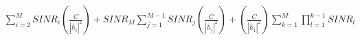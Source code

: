 \documentclass[preview]{standalone}
\begin{document}
\begin{align*}
\sum_{i=2}^{M} SINR_i \left( \frac{C}{\left|{\hat{h}_i}\right|^2} \right) + SINR_M \sum_{j=1}^{M-1} SINR_j \left( \frac{C}{\left|{\hat{h}_j}\right|^2} \right) + \left( \frac{C}{\left|{\hat{h}_1}\right|^2} \right) \sum_{k=1}^{M} \prod_{l=1}^{k-1} SINR_l
\end{align*}
\end{document}
